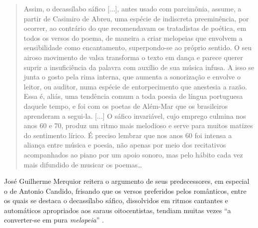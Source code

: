 \documentclass[portuguese]{textolivre}
\begin{document}
\begin{quote}
    Assim, o decassílabo sáfico [...], antes usado com parcimônia, assume, a partir de Casimiro de Abreu, uma espécie de indiscreta preeminência, por ocorrer, ao contrário do que recomendavam os tratadistas de poética, em todos os versos do poema, de maneira a criar melopeias que envolvem a sensibilidade como encantamento, superpondo-se ao próprio sentido. O seu airoso movimento de valsa transforma o texto em dança e parece querer suprir a insuficiência da palavra com auxílio de sua música infusa. A isso se junta o gosto pela rima interna, que aumenta a sonorização e envolve o leitor, ou auditor, numa espécie de entorpecimento que anestesia a razão. Essa é, aliás, uma tendência comum a toda poesia de língua portuguesa daquele tempo, e foi com os poetas de Além-Mar que os brasileiros aprenderam a segui-la. [...] O sáfico invariável, cujo emprego culmina nos anos 60 e 70, produz um ritmo mais melodioso e serve para muitos matizes do sentimento lírico. É preciso lembrar que nos anos 60 foi intensa a aliança entre música e poesia, não apenas por meio dos recitativos acompanhados ao piano por um apoio sonoro, mas pelo hábito cada vez mais difundido de musicar os poemas…
\end{quote}

José Guilherme Merquior reitera o argumento de seus predecessores, em especial o de Antonio Candido, frisando que os versos preferidos pelos românticos, entre os quais se destaca o decassílabo sáfico, dissolvidos em ritmos cantantes e automáticos apropriados aos saraus oitocentistas, tendiam muitas vezes “a converter-se em pura \textit{melopeia}” \cite[p.~74]{merquior1979anchieta}.
\end{document}

